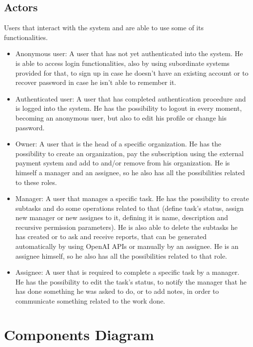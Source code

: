 \documentclass{article}
\begin{document}
\subsection{Actors}
Users that interact with the system and are able to use some of its functionalities.
\begin{itemize}
    \item Anonymous user: A user that has not yet authenticated into the system. He is able to access login functionalities, also by using subordinate systems provided for that, to sign up in case he doesn't have an existing account or to recover password in case he isn't able to remember it.
    \item Authenticated user: A user that has completed authentication procedure and is logged into the system. He has the possibility to logout in every moment, becoming an anonymous user, but also to edit his profile or change his password.
    \item Owner: A user that is the head of a specific organization. He has the possibility to create an organization, pay the subscription using the external payment system and add to and/or remove from his organization. He is himself a manager and an assignee, so he also has all the possibilities related to these roles.
    \item Manager: A user that manages a specific task. He has the possibility to create subtasks and do some operations related to that (define task's status, assign new manager or new assignes to it, defining it is name, description and recursive permission parameters). He is also able to delete the subtasks he has created or to ask and receive reports, that can be generated automatically by using OpenAI APIs or manually by an assignee. He is an assignee himself, so he also has all the possibilities related to that role.
    \item Assignee: A user that is required to complete a specific task by a manager. He has the possibility to edit the task's status, to notify the manager that he has done something he was asked to do, or to add notes, in order to communicate something related to the work done.
\end{itemize}

\section{Components Diagram}
\end{document}
